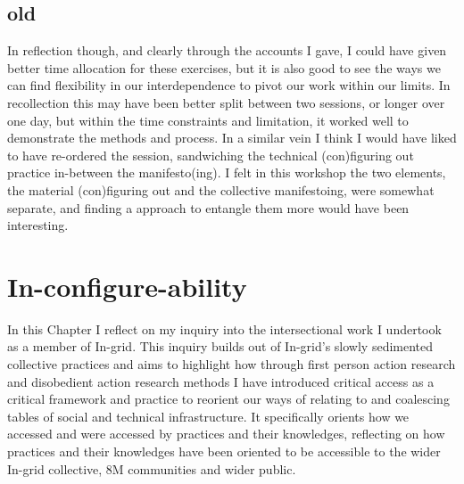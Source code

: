 \hypertarget{old}{%
\subsection{old}\label{old}}

In reflection though, and clearly through the accounts I gave, I could
have given better time allocation for these exercises, but it is also
good to see the ways we can find flexibility in our interdependence to
pivot our work within our limits. In recollection this may have been
better split between two sessions, or longer over one day, but within
the time constraints and limitation, it worked well to demonstrate the
methods and process. In a similar vein I think I would have liked to
have re-ordered the session, sandwiching the technical (con)figuring out
practice in-between the manifesto(ing). I felt in this workshop the two
elements, the material (con)figuring out and the collective
manifestoing, were somewhat separate, and finding a approach to entangle
them more would have been interesting.

\hypertarget{in-configure-ability-1}{%
\section{In-configure-ability}\label{in-configure-ability-1}}

In this Chapter I reflect on my inquiry into the intersectional work I
undertook as a member of In-grid. This inquiry builds out of In-grid's
slowly sedimented collective practices and aims to highlight how through
first person action research and disobedient action research methods I
have introduced critical access as a critical framework and practice to
reorient our ways of relating to and coalescing tables of social and
technical infrastructure. It specifically orients how we accessed and
were accessed by practices and their knowledges, reflecting on how
practices and their knowledges have been oriented to be accessible to
the wider In-grid collective, 8M communities and wider public.

